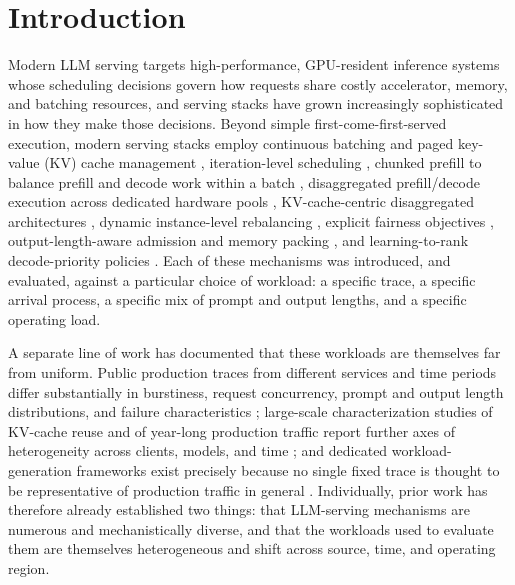 \section{Introduction}
\label{sec:introduction}

Modern LLM serving targets high-performance, GPU-resident inference
systems whose scheduling decisions govern how requests share costly
accelerator, memory, and batching resources, and serving stacks have grown
increasingly sophisticated in how they make those decisions. Beyond simple
first-come-first-served execution, modern serving stacks employ continuous
batching and paged key-value (KV)
cache management
\citep{kwon2023vllm}, iteration-level scheduling \citep{yu2022orca}, chunked
prefill to balance prefill and decode work within a batch
\citep{agrawal2024sarathi}, disaggregated prefill/decode execution across
dedicated hardware pools \citep{zhong2024distserve,patel2024splitwise},
KV-cache-centric disaggregated architectures \citep{qin2025mooncake},
dynamic instance-level rebalancing \citep{sun2024llumnix}, explicit
fairness objectives \citep{sheng2024vtc}, output-length-aware admission and
memory packing \citep{jin2023s3}, and learning-to-rank decode-priority
policies \citep{efficientllmscheduling2024}. Each of these mechanisms was
introduced, and evaluated, against a particular choice of workload: a
specific trace, a specific arrival process, a specific mix of prompt and
output lengths, and a specific operating load.

A separate line of work has documented that these workloads are themselves
far from uniform. Public production traces from different services and time
periods differ substantially in burstiness, request concurrency, prompt and
output length distributions, and failure characteristics
\citep{burstgpt2025,patel2024splitwise,stojkovic2025dynamollm}; large-scale
characterization studies of KV-cache reuse and of year-long production
traffic report further axes of heterogeneity across clients, models, and
time \citep{kvcache_wild2025,ayearinllmserving2026}; and dedicated
workload-generation frameworks exist precisely because no single fixed trace
is thought to be representative of production traffic in general
\citep{servegen2026}. Individually, prior work has therefore already
established two things: that LLM-serving mechanisms are numerous and
mechanistically diverse, and that the workloads used to evaluate them are
themselves heterogeneous and shift across source, time, and operating
region.

